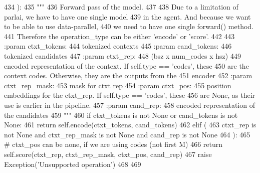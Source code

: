 \begin{DoxyCode}
434     ):
435         \textcolor{stringliteral}{"""}
436 \textcolor{stringliteral}{        Forward pass of the model.}
437 \textcolor{stringliteral}{}
438 \textcolor{stringliteral}{        Due to a limitation of parlai, we have to have one single model}
439 \textcolor{stringliteral}{        in the agent. And because we want to be able to use data-parallel,}
440 \textcolor{stringliteral}{        we need to have one single forward() method.}
441 \textcolor{stringliteral}{        Therefore the operation\_type can be either 'encode' or 'score'.}
442 \textcolor{stringliteral}{}
443 \textcolor{stringliteral}{        :param ctxt\_tokens:}
444 \textcolor{stringliteral}{            tokenized contexts}
445 \textcolor{stringliteral}{        :param cand\_tokens:}
446 \textcolor{stringliteral}{            tokenized candidates}
447 \textcolor{stringliteral}{        :param ctxt\_rep:}
448 \textcolor{stringliteral}{            (bsz x num\_codes x hsz)}
449 \textcolor{stringliteral}{            encoded representation of the context. If self.type == 'codes', these}
450 \textcolor{stringliteral}{            are the context codes. Otherwise, they are the outputs from the}
451 \textcolor{stringliteral}{            encoder}
452 \textcolor{stringliteral}{        :param ctxt\_rep\_mask:}
453 \textcolor{stringliteral}{            mask for ctxt rep}
454 \textcolor{stringliteral}{        :param ctxt\_pos:}
455 \textcolor{stringliteral}{            position embeddings for the ctxt\_rep. If self.type == 'codes', these}
456 \textcolor{stringliteral}{            are None, as their use is earlier in the pipeline.}
457 \textcolor{stringliteral}{        :param cand\_rep:}
458 \textcolor{stringliteral}{            encoded representation of the candidates}
459 \textcolor{stringliteral}{        """}
460         \textcolor{keywordflow}{if} ctxt\_tokens \textcolor{keywordflow}{is} \textcolor{keywordflow}{not} \textcolor{keywordtype}{None} \textcolor{keywordflow}{or} cand\_tokens \textcolor{keywordflow}{is} \textcolor{keywordflow}{not} \textcolor{keywordtype}{None}:
461             \textcolor{keywordflow}{return} self.encode(ctxt\_tokens, cand\_tokens)
462         \textcolor{keywordflow}{elif} (
463             ctxt\_rep \textcolor{keywordflow}{is} \textcolor{keywordflow}{not} \textcolor{keywordtype}{None} \textcolor{keywordflow}{and} ctxt\_rep\_mask \textcolor{keywordflow}{is} \textcolor{keywordflow}{not} \textcolor{keywordtype}{None} \textcolor{keywordflow}{and} cand\_rep \textcolor{keywordflow}{is} \textcolor{keywordflow}{not} \textcolor{keywordtype}{None}
464         ):
465             \textcolor{comment}{# ctxt\_pos can be none, if we are using codes (not first M)}
466             \textcolor{keywordflow}{return} self.score(ctxt\_rep, ctxt\_rep\_mask, ctxt\_pos, cand\_rep)
467         \textcolor{keywordflow}{raise} Exception(\textcolor{stringliteral}{'Unsupported operation'})
468 
469 
\end{DoxyCode}
